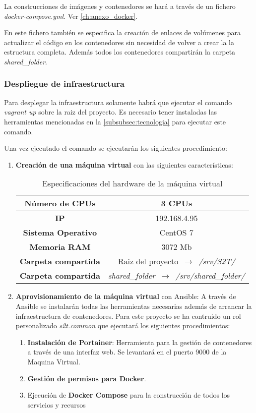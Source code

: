 \documentclass[../main.tex]{subfiles}
\begin{document}
La construcciones de imágenes y contenedores se hará a través de un fichero \textit{docker-compose.yml}. Ver \autoref{ch:anexo_docker}.

En este fichero también se especifica la creación de enlaces de volúmenes para actualizar el código en los contenedores sin necesidad de volver a crear la la estructura completa. Además todos los contenedores compartirán la carpeta \textit{shared\_folder}.

\subsubsection{Despliegue de infraestructura}\label{subsubsec:despliegue}
Para desplegar la infraestructura solamente habrá que ejecutar el comando \textit{vagrant up} sobre la raiz del proyecto. Es necesario tener instaladas las herramientas mencionadas en la \autoref{subsubsec:tecnologia} para ejecutar este comando.

Una vez ejecutado el comando se ejecutarán los siguientes procedimiento:
\begin{enumerate}
    \item \textbf{Creación de una máquina virtual} con las siguientes características:
    \begin{table}[]
    \centering
        \begin{tabular}{ |c|c| } 
         \hline
         \textbf{Número de CPUs} & 3 CPUs \\ 
         \hline
         \textbf{IP} & 192.168.4.95 \\ 
         \hline
         \textbf{Sistema Operativo} & CentOS 7\\ 
         \hline
         \textbf{Memoria RAM} & 3072 Mb\\ 
         \hline
         \textbf{Carpeta compartida} & Raiz del proyecto $\,\to\,$ \textit{/srv/S2T/}\\ 
         \hline
         \textbf{Carpeta compartida} & \textit{shared\_folder} $\,\to\,$ \textit{/srv/shared\_folder/}\\ 
         \hline
        \end{tabular}
    \caption{Especificaciones del hardware de la máquina virtual}
    \label{tab:my_label}
    \end{table}
    
    \item \textbf{Aprovisionamiento de la máquina virtual} con Ansible: A través de Ansible se instalarán todas las herramientas necesarias además de arrancar la infraestructura de contenedores. Para este proyecto se ha contruido un rol personalizado \textit{s2t.common} que ejecutará los siguientes procedimientos:
    \begin{enumerate}
        \item \textbf{Instalación de Portainer}: Herramienta para la gestión de contenedores a través de una interfaz web. Se levantará en el puerto 9000 de la Maquina Virtual.
        \item \textbf{Gestión de permisos para Docker}.
        \item Ejecución de \textbf{Docker Compose} para la construcción de todos los servicios y recursos
    \end{enumerate}
\end{enumerate}
\end{document}
